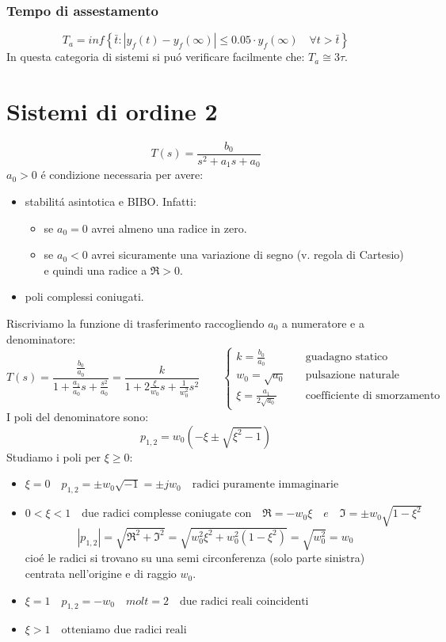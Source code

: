 \documentclass[../main.tex]{subfiles}
\begin{document}
	\subsubsection{Tempo di assestamento}
		\[
			T_a = inf \left\lbrace \bar t : | y_f(t) - y_f(\infty) | \leq 0.05 \cdot y_f(\infty) \quad \forall t > \bar t \right\rbrace
		\]
		In questa categoria di sistemi si pu\'o verificare facilmente che: $ T_a \cong 3\tau $.
		
	\section{Sistemi di ordine 2}
		\[ 
			T(s) = \frac{b_0}{s^2+a_1s+a_0}
		\]
		$ a_0 > 0 $ \'e condizione necessaria per avere:
		\begin{itemize}
			\item 
				stabilit\'a asintotica e BIBO. Infatti:
				\begin{itemize}
					\item 
						se $ a_0 = 0 $ avrei almeno una radice in zero.
					\item 
						se $ a_0 < 0 $ avrei sicuramente una variazione di segno (v. regola di Cartesio) e quindi una radice a $ \Re>0 $.
				\end{itemize}
			\item 
				poli complessi coniugati.
		\end{itemize}
		Riscriviamo la funzione di trasferimento raccogliendo $ a_0 $ a numeratore e a denominatore:
		\[ 
			T(s) = \frac{\frac{b_0}{a_0}}{1+\frac{a_1}{a_0}s+\frac{s^2}{a_0}} = \frac{k}{1 + 2\frac{\xi}{w_0}s + \frac{1}{w_0^2}s^2}
			\qquad
			\begin{cases}
				k = \frac{b_0}{a_0} \quad &\text{guadagno statico}
				\\
				w_0 = \sqrt{a_0} \quad &\text{pulsazione naturale}
				\\
				\xi = \frac{a_1}{2\sqrt{a_0}} \quad &\text{coefficiente di smorzamento}
			\end{cases}
		\]
		I poli del denominatore sono:
		\[ 
			p_{1,2} = w_0(-\xi \pm \sqrt{\xi^2-1})
		\]
		Studiamo i poli per $ \xi \geq 0 $:
		\begin{itemize}
			\item 
				$ \xi = 0 \quad p_{1,2} =\pm w_0 \sqrt{-1} = \pm jw_0 \quad \text{radici puramente immaginarie}$
			\item 
				$ 0 < \xi < 1 \quad \text{due radici complesse coniugate con} \quad \Re = -w_0\xi \quad e \quad \Im = \pm w_0 \sqrt{1-\xi^2} $
				\[ 
					\left| p_{1,2} \right| = \sqrt{\Re^2 + \Im^2} = \sqrt{w_0^2\xi^2 + w_0^2(1-\xi^2)} = \sqrt{w_0^2} = w_0
				\]
				cio\'e le radici si trovano su una semi circonferenza (solo parte sinistra) centrata nell'origine e di raggio $ w_0 $.
			\item 
				$ \xi = 1 \quad p_{1,2} = -w_0 \quad molt=2 \quad \text{due radici reali coincidenti} $
			\item 
				$ \xi > 1 \quad \text{otteniamo due radici reali} $
		\end{itemize}
\end{document}
